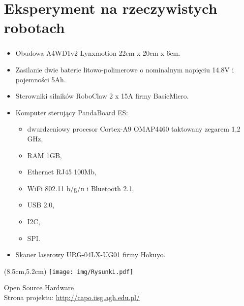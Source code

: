 \section*{Eksperyment na rzeczywistych robotach}
\begin{frame}
\frametitle{\secname}

\begin{itemize}
	\item Obudowa A4WD1v2 Lynxmotion 22cm x 20cm x 6cm.
	\item Zasilanie dwie baterie litowo-polimerowe o nominalnym napięciu 14.8V i pojemności 5Ah.
	\item Sterowniki silników RoboClaw 2 x 15A firmy BasicMicro.
	\item Komputer sterujący PandaBoard ES:	
	\begin{itemize}
		\item dwurdzeniowy procesor Cortex-A9 OMAP4460 taktowany zegarem 1,2 GHz,
		\item RAM 1GB,
		\item Ethernet RJ45 100Mb,
		\item WiFi 802.11 b/g/n i Bluetooth 2.1,
		\item USB 2.0,
		\item I2C,
		\item SPI.
	\end{itemize}
	\item Skaner laserowy URG-04LX-UG01 firmy Hokuyo.	
\end{itemize}

\begin{textblock*}{4cm}(8.5cm,5.2cm) %
	\texttt{[image: img/Rysunki.pdf]}
\end{textblock*}
\tiny{
	Open Source Hardware \\
	Strona projektu: \url{http://capo.iisg.agh.edu.pl/}}

\end{frame}

